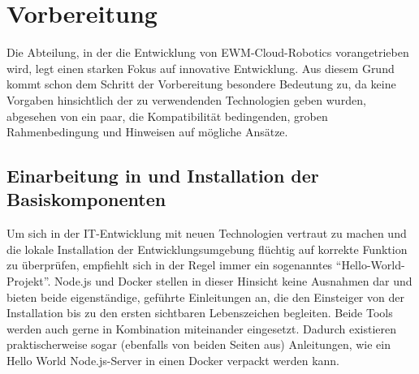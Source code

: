\chapter{Vorbereitung}
Die Abteilung, in der die Entwicklung von \ac{EWM}-Cloud-Robotics vorangetrieben wird, legt einen starken Fokus auf innovative Entwicklung.
Aus diesem Grund kommt schon dem Schritt der Vorbereitung besondere Bedeutung zu, da keine Vorgaben hinsichtlich der zu verwendenden Technologien geben wurden, abgesehen von ein paar, die Kompatibilität bedingenden, groben Rahmenbedingung und Hinweisen auf mögliche Ansätze.


\section{Einarbeitung in und Installation der Basiskomponenten}
\label{sec:einarbeitung}
Um sich in der IT-Entwicklung mit neuen Technologien vertraut zu machen und die lokale Installation der Entwicklungsumgebung flüchtig auf korrekte Funktion zu überprüfen, empfiehlt sich in der Regel immer ein sogenanntes \enquote{Hello-World-Projekt}.
Node.js und Docker stellen in dieser Hinsicht keine Ausnahmen dar und bieten beide eigenständige, geführte Einleitungen an, die den Einsteiger von der Installation bis zu den ersten sichtbaren Lebenszeichen begleiten.
Beide Tools werden auch gerne in Kombination miteinander eingesetzt.
Dadurch existieren praktischerweise sogar (ebenfalls von beiden Seiten aus) Anleitungen, wie ein Hello World Node.js-Server in einen Docker verpackt werden kann.

